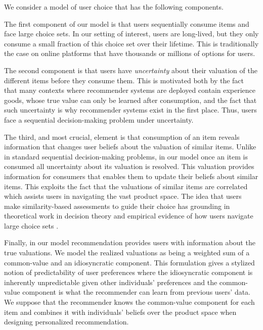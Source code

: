 \documentclass[format=acmsmall, review=false]{acmart}
\newcommand{\xhdr}[1]{\vspace{1mm} \noindent{\bf #1}}
\begin{document}
\xhdr{Our Model} We consider a model of user choice that has the following components.
\par
The first component of our model is that users sequentially consume items and face large choice sets. In our setting of interest, users are long-lived, but they only consume a small fraction of this choice set over their lifetime. This is traditionally the case on online platforms that have thousands or millions of options for users.
\par
The second component is that users have \textit{uncertainty} about their valuation of the different items before they consume them. This is motivated both by the fact that many contexts where recommender systems are deployed contain experience goods, whose true value can only be learned after consumption, and the fact that such uncertainty is why recommender systems exist in the first place. Thus, users face a sequential decision-making problem under uncertainty.
\par 
The third, and most crucial, element is that consumption of an item reveals information that changes user beliefs about the valuation of similar items. Unlike in standard sequential decision-making problems, in our model once an item is consumed all uncertainty about its valuation is resolved. This valuation provides information for consumers that enables them to update their beliefs about similar items. This exploits the fact that the valuations of similar items are correlated which assists users in navigating the vast product space. The idea that users make similarity-based assessments to guide their choice has grounding in theoretical work in decision theory \cite{gilboa1995case} and empirical evidence of how users navigate large choice sets \cite{schulz2019structured}.
\par 
Finally, in our model recommendation provides users with information about the true valuations. We model the realized valuations as being a weighted sum of a common-value and an idiosyncratic component. This formulation gives a stylized notion of predictability of user preferences where the idiosyncratic component is inherently unpredictable given other individuals' preferences and the common-value component is what the recommender can learn from previous users' data. We suppose that the recommender knows the common-value component for each item and combines it with individuals' beliefs over the product space when designing personalized recommendation.
\end{document}
